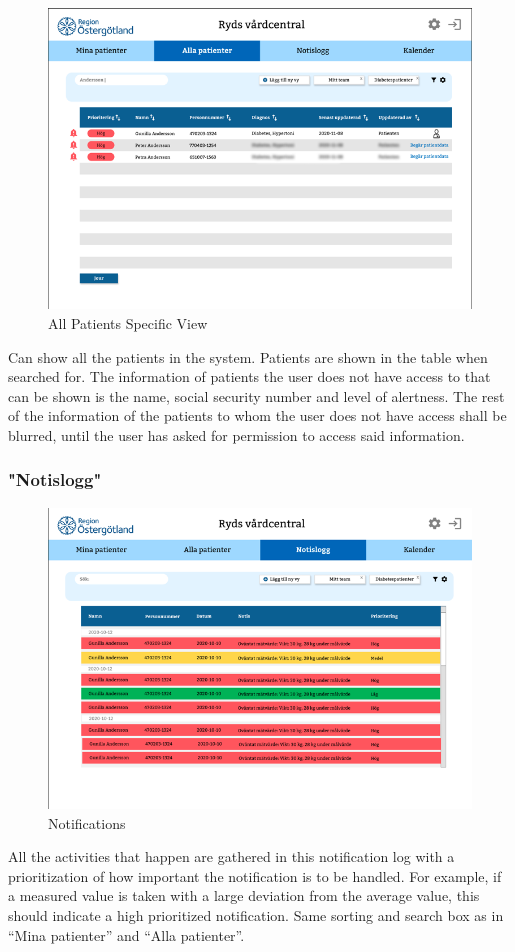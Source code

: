 \documentclass{scrreprt}
\begin{document}
\begin{figure}[h!]
    \centering
    \includegraphics[width=15cm]{allpatdiabetes.png}
    \caption{All Patients Specific View}
    \label{fig: allpatdiabetes}
\end{figure}
Can show all the patients in the system. Patients are shown in the table when searched for. The information of patients the user does not have access to that can be shown is the name, social security number and level of alertness. The rest of the information of the patients to whom the user does not have access shall be blurred, until the user has asked for permission to access said information. 

\clearpage

\subsubsection{"Notislogg"}
\begin{figure}[h!]
    \centering
    \includegraphics[width=15cm]{notifications.png}
    \caption{Notifications}
    \label{fig: notifications}
\end{figure}
All the activities that happen are gathered in this notification log with a prioritization of how important the notification is to be handled. For example, if a measured value is taken with a large deviation from the average value, this should indicate a high prioritized notification.
Same sorting and search box as in “Mina patienter” and “Alla patienter”.
\end{document}
